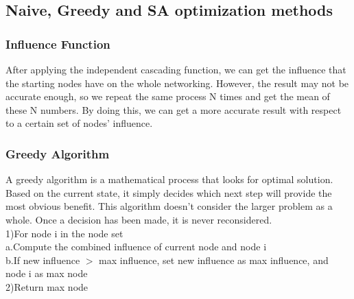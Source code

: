 \documentclass{article}
\begin{document}
\subsection{Naive, Greedy and SA optimization methods}   %


\subsubsection{Influence Function}   %
After applying the independent cascading function, we can get the influence that the starting nodes have on the whole networking. However, the result may not be accurate enough, so we repeat the same process N times and get the mean of these N numbers. By doing this, we can get a more accurate result with respect to a certain set of nodes' influence.

\subsubsection{Greedy Algorithm}   %
A greedy algorithm is a mathematical process that looks for optimal solution. Based on the current state, it simply decides which next step will provide the most obvious benefit. This algorithm doesn't consider the larger problem as a whole. Once a decision has been made, it is never reconsidered. \\

\-\hspace{0.5cm}1)For node i in the node set \\
\-\hspace{1cm}a.Compute the combined influence of current node and node i \\
\-\hspace{1cm}b.If new influence $>$ max influence, set new influence as max influence, and node i as max node \\
\-\hspace{0.5cm}2)Return max node
\end{document}
